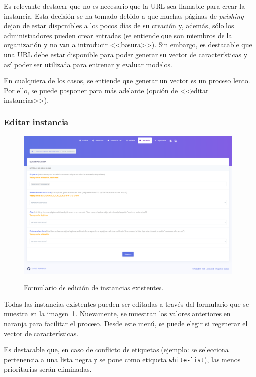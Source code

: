Es relevante destacar que no es necesario que la URL sea llamable para crear la instancia. Esta decisión se ha tomado debido a que muchas páginas de \textit{phishing} dejan de estar disponibles a los pocos días de su creación y, además, sólo los administradores pueden crear entradas (se entiende que son miembros de la organización y no van a introducir <<basura>>). Sin embargo, es destacable que una URL debe estar disponible para poder generar su vector de características y así poder ser utilizada para entrenar y evaluar modelos.

En cualquiera de los casos, se entiende que generar un vector es un proceso lento. Por ello, se puede posponer para más adelante (opción de <<editar instancias>>).

\subsubsection{Editar instancia}

\begin{figure}[h]
	\caption[Manual de usuario: editar instancia]{Formulario de edición de instancias existentes.}
	\centering
	\includegraphics[scale=0.18]{../img/anexos/user_guide/6_edit_instance}
	\label{e-5:edit-instance}
\end{figure}

Todas las instancias existentes pueden ser editadas a través del formulario que se muestra en la imagen~\ref{e-5:edit-instance}. Nuevamente, se muestran los valores anteriores en naranja para facilitar el proceso. Desde este menú, se puede elegir si regenerar el vector de características.

Es destacable que, en caso de conflicto de etiquetas (ejemplo: se selecciona pertenencia a una lista negra y se pone como etiqueta \texttt{white-list}), las menos prioritarias serán eliminadas.

